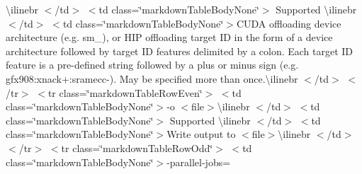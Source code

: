 \begin{longtabu}
{\ttfamily \textbackslash{}ilinebr \texorpdfstring{$<$}{<}/td\texorpdfstring{$>$}{>} \texorpdfstring{$<$}{<}td class=\char`\"{}markdown\+Table\+Body\+None\char`\"{}\texorpdfstring{$>$}{>} Supported \textbackslash{}ilinebr \texorpdfstring{$<$}{<}/td\texorpdfstring{$>$}{>} \texorpdfstring{$<$}{<}td class=\char`\"{}markdown\+Table\+Body\+None\char`\"{}\texorpdfstring{$>$}{>}}CUDA offloading device architecture (e.\+g. sm\+\_), or HIP offloading target ID in the form of a device architecture followed by target ID features delimited by a colon. Each target ID feature is a pre-\/defined string followed by a plus or minus sign (e.\+g. gfx908\+:xnack+\+:sramecc-\/). May be specified more than once.{\ttfamily \textbackslash{}ilinebr \texorpdfstring{$<$}{<}/td\texorpdfstring{$>$}{>} \texorpdfstring{$<$}{<}/tr\texorpdfstring{$>$}{>} \texorpdfstring{$<$}{<}tr class=\char`\"{}markdown\+Table\+Row\+Even\char`\"{}\texorpdfstring{$>$}{>} \texorpdfstring{$<$}{<}td class=\char`\"{}markdown\+Table\+Body\+None\char`\"{}\texorpdfstring{$>$}{>}}-\/o $<$file$>${\ttfamily \textbackslash{}ilinebr \texorpdfstring{$<$}{<}/td\texorpdfstring{$>$}{>} \texorpdfstring{$<$}{<}td class=\char`\"{}markdown\+Table\+Body\+None\char`\"{}\texorpdfstring{$>$}{>} Supported \textbackslash{}ilinebr \texorpdfstring{$<$}{<}/td\texorpdfstring{$>$}{>} \texorpdfstring{$<$}{<}td class=\char`\"{}markdown\+Table\+Body\+None\char`\"{}\texorpdfstring{$>$}{>}}Write output to $<$file$>${\ttfamily \textbackslash{}ilinebr \texorpdfstring{$<$}{<}/td\texorpdfstring{$>$}{>} \texorpdfstring{$<$}{<}/tr\texorpdfstring{$>$}{>} \texorpdfstring{$<$}{<}tr class=\char`\"{}markdown\+Table\+Row\+Odd\char`\"{}\texorpdfstring{$>$}{>} \texorpdfstring{$<$}{<}td class=\char`\"{}markdown\+Table\+Body\+None\char`\"{}\texorpdfstring{$>$}{>}}-\/parallel-\/jobs=


\end{longtabu}
